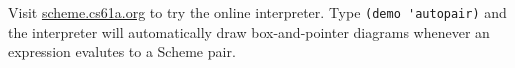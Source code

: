 Visit \url{scheme.cs61a.org} to try the online interpreter. Type \lstinline$(demo 'autopair)$
and the interpreter will automatically draw box-and-pointer diagrams whenever an expression
evalutes to a Scheme pair.